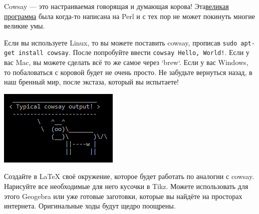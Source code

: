 \documentclass[12pt, a4paper, oneside]{article}
\begin{document}
Cowsay — это настраиваемая говорящая и думающая корова! Эта\href{http://citkit.ru/articles/679/}{великая программа} была когда-то написана на Perl и с тех пор не может покинуть многие великие умы.

Если вы используете Linux, то вы можете поставить cowsay, прописав \texttt{sudo apt-get install cowsay}. После попробуйте ввести \texttt{cowsay Hello, World!}. Если у вас Mac, вы можете сделать всё то же самое через `brew`. Если у вас Windows, то побаловаться с коровой будет не очень просто. Не забудьте вернуться назад, в наш бренный мир, после экстаза, который вы испытаете!

\begin{center}
\includegraphics[scale=1]{Cowsay_Typical_Output.png}
\end{center}

Создайте в LaTeX своё окружение, которое будет работать по аналогии с cowsay. Нарисуйте все необходимые для него кусочки в Tikz. Можете использовать для этого Geogebra или уже готовые заготовки, которые вы найдёте на просторах интернета. Оригинальные ходы будут щедро поощрены.
\end{document}
